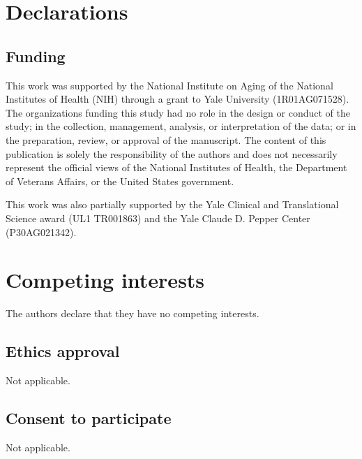 \documentclass{bmcart}
\begin{document}
\begin{backmatter}


\section*{Declarations}

\subsection*{Funding}%

This work was supported by the National Institute on Aging of the 
National Institutes of Health (NIH) through a grant to Yale 
University (1R01AG071528). The organizations funding this study had no role 
in the design or conduct of the study; in the collection, management, 
analysis, or interpretation of the data; or in the preparation, review, or 
approval of the manuscript. The content of this publication is solely the 
responsibility of the authors and does not necessarily represent the official 
views of the National Institutes of Health, the Department of Veterans 
Affairs, or the United States government. 

This work was also partially supported by the Yale Clinical and 
Translational Science award (UL1 TR001863) and the Yale Claude D. Pepper 
Center (P30AG021342).

\section*{Competing interests}

The authors declare that they have no competing interests.

\subsection*{Ethics approval}

Not applicable.

\subsection*{Consent to participate}

Not applicable.


\end{backmatter}
\end{document}
